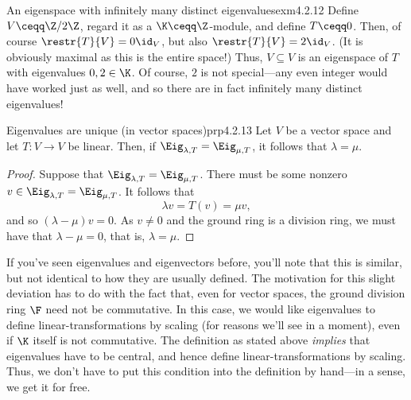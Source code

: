 \begin{exm}{An eigenspace with infinitely many distinct eigenvalues}{exm4.2.12}
	Define $V\ceqq \Z /2\Z$, regard it as a $\K \ceqq \Z$-module, and define $T\ceqq 0$.  Then, of course $\restr{T}{V}=0\id _V$, but also $\restr{T}{V}=2\id _V$.  (It is obviously maximal as this is the entire space!)  Thus, $V\subseteq V$ is an eigenspace of $T$ with eigenvalues $0,2\in \K$.  Of course, $2$ is not special---any even integer would have worked just as well, and so there are in fact infinitely many distinct eigenvalues!
\end{exm}
\begin{prp}{Eigenvalues are unique (in vector spaces)}{prp4.2.13}
	Let $V$ be a vector space and let $T\colon V\rightarrow V$ be linear.  Then, if $\Eig _{\lambda ,T}=\Eig _{\mu ,T}$, it follows that $\lambda =\mu$.
	\begin{proof}
		Suppose that $\Eig _{\lambda ,T}=\Eig _{\mu ,T}$.  There must be some nonzero $v\in \Eig _{\lambda ,T}=\Eig _{\mu ,T}$.  It follows that
		\begin{equation}
			\lambda v=T(v)=\mu v,
		\end{equation}
		and so $(\lambda -\mu )v=0$.  As $v\neq 0$ and the ground ring is a division ring, we must have that $\lambda -\mu =0$, that is, $\lambda =\mu$.
	\end{proof}
\end{prp}

If you've seen eigenvalues and eigenvectors before, you'll note that this is similar, but not identical to how they are usually defined.  The motivation for this slight deviation has to do with the fact that, even for vector spaces, the ground division ring $\F$ need not be commutative.  In this case, we would like eigenvalues to define linear-transformations by scaling (for reasons we'll see in a moment), even if $\K$ itself is not commutative.  The definition as stated above \emph{implies} that eigenvalues have to be central, and hence define linear-transformations by scaling.  Thus, we don't have to put this condition into the definition by hand---in a sense, we get it for free.

